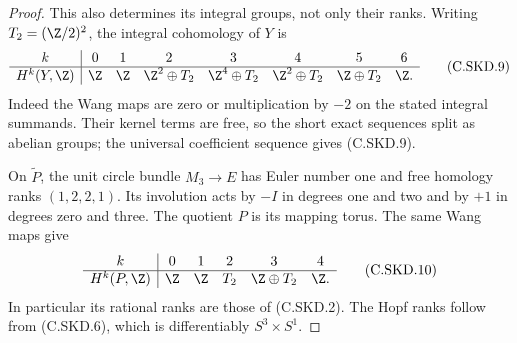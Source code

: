 \begin{proof}
This also determines its integral groups,
not only their ranks. Writing $T_2=(\Z/2)^2$,
the integral cohomology of $Y$ is
\[
 \begin{array}{c|ccccccc}
 k&0&1&2&3&4&5&6\\ \hline
 H^k(Y,\Z)&
 \Z&\Z&\Z^2\oplus T_2&\Z^4\oplus T_2&
 \Z^2\oplus T_2&\Z\oplus T_2&\Z .
 \end{array}                                             \tag{C.SKD.9}
\]
Indeed the Wang maps are zero or multiplication
by $-2$ on the stated integral summands.
Their kernel terms are free, so the short
exact sequences split as abelian groups;
the universal coefficient sequence gives
(C.SKD.9).

On $\widetilde P$, the unit circle bundle
$M_3\to E$ has Euler number one and free
homology ranks $(1,2,2,1)$. Its involution
acts by $-I$ in degrees one and two and
by $+1$ in degrees zero and three.
The quotient $P$ is its mapping torus.
The same Wang maps give
\[
 \begin{array}{c|ccccc}
 k&0&1&2&3&4\\ \hline
 H^k(P,\Z)&
 \Z&\Z&T_2&\Z\oplus T_2&\Z .
 \end{array}                                             \tag{C.SKD.10}
\]
In particular its rational ranks are those
of (C.SKD.2). The Hopf ranks follow from
(C.SKD.6), which is differentiably
$S^3\times S^1$.


\end{proof}
